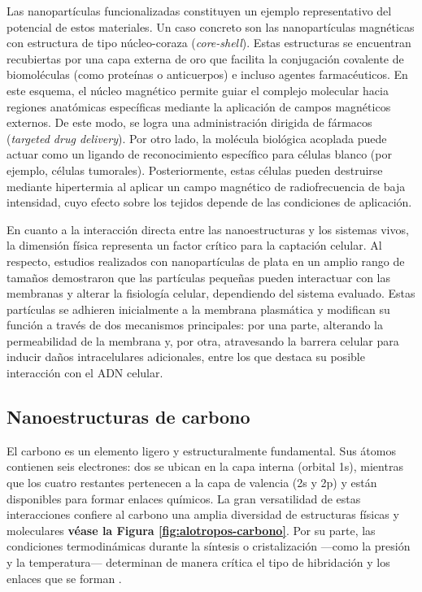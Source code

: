 Las nanopartículas funcionalizadas constituyen un ejemplo representativo del potencial de estos materiales. Un caso concreto son las nanopartículas magnéticas con estructura de tipo núcleo-coraza (\textit{core-shell}). Estas estructuras se encuentran recubiertas por una capa externa de oro que facilita la conjugación covalente de biomoléculas (como proteínas o anticuerpos) e incluso agentes farmacéuticos. En este esquema, el núcleo magnético permite guiar el complejo molecular hacia regiones anatómicas específicas mediante la aplicación de campos magnéticos externos. De este modo, se logra una administración dirigida de fármacos (\textit{targeted drug delivery}). Por otro lado, la molécula biológica acoplada puede actuar como un ligando de reconocimiento específico para células blanco (por ejemplo, células tumorales). Posteriormente, estas células pueden destruirse mediante hipertermia al aplicar un campo magnético de radiofrecuencia de baja intensidad, cuyo efecto sobre los tejidos depende de las condiciones de aplicación. 

En cuanto a la interacción directa entre las nanoestructuras y los sistemas vivos, la dimensión física representa un factor crítico para la captación celular. Al respecto, estudios realizados con nanopartículas de plata en un amplio rango de tamaños demostraron que las partículas pequeñas pueden interactuar con las membranas y alterar la fisiología celular, dependiendo del sistema evaluado. Estas partículas se adhieren inicialmente a la membrana plasmática y modifican su función a través de dos mecanismos principales: por una parte, alterando la permeabilidad de la membrana y, por otra, atravesando la barrera celular para inducir daños intracelulares adicionales, entre los que destaca su posible interacción con el ADN celular. 
\subsection{Nanoestructuras de carbono}
El carbono es un elemento ligero y estructuralmente fundamental. Sus átomos contienen seis electrones: dos se ubican en la capa interna (orbital 1s), mientras que los cuatro restantes pertenecen a la capa de valencia (2s y 2p) y están disponibles para formar enlaces químicos. La gran versatilidad de estas interacciones confiere al carbono una amplia diversidad de estructuras físicas y moleculares \textbf{véase la Figura \ref{fig:alotropos-carbono}}. Por su parte, las condiciones termodinámicas durante la síntesis o cristalización —como la presión y la temperatura— determinan de manera crítica el tipo de hibridación y los enlaces que se forman \cite{martinez2024emergence}.

